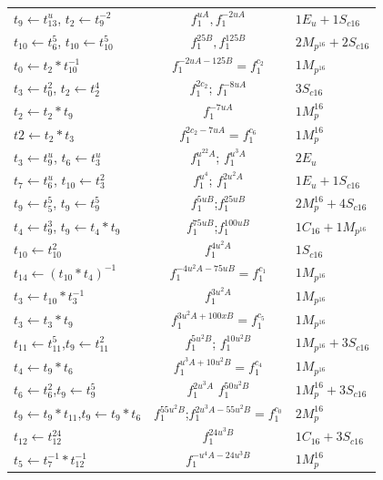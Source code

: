 \begin{center}
\begin{table}[!ht]
{\begin{tabular}{l|c|l}
			\hline
			$t_9 \leftarrow t_{13}^{u}$, $t_2 \leftarrow t_9^{-2}$& $f_1^{uA}, f_1^{-2uA}$&$1E_u+1S_{c16}$\\
			$t_{10} \leftarrow t_6^5$, 	$t_{10} \leftarrow t_{10}^5$&$ f_1^{25B}, f_1^{125B}$&$2M_{p^{16}}+2S_{c16}$\\
			$t_{0} \leftarrow t_2*t_{10}^{-1}$&$f_1^{-2uA-125B}=f_1^{c_2}$&$1M_{p^{16}}$\\
			\hline
			$t_{3} \leftarrow t_0^2$, 	$t_2 \leftarrow t_2^4$ & $f_1^{2c_2}$; $f_1^{-8uA}$ & $3S_{c16}$\\
			$t_2 \leftarrow t_2*t_9$ & $f_1^{-7uA}$& $1M_p^{16}$\\
			$t2 \leftarrow t_2*t_3$& $f_1^{2c_2-7uA} = f_1^{c_6}$& $1M_p^{16}$ \\
			$t_3 \leftarrow t_9^{u}$, $t_6 \leftarrow t_3^{u}$ & $f_1^{u^22A}$; $f_1^{u^3A}$ & $2E_u$\\
			$t_7 \leftarrow t_6^{u}$, $t_{10} \leftarrow t_3^{2}$&$f_1^{u^4}$; $f_1^{2u^2A}$& $1E_u + 1S_{c16}$\\
			\hline
			$t_{9} \leftarrow t_5^5$, $t_{9} \leftarrow t_9^5$&$f_1^{5uB}$;$f_1^{25uB}$&$2M_p^{16}+4S_{c16}$\\
			$t_{4} \leftarrow t_9^3$, $t_{9} \leftarrow t_4*t_9$&$f_1^{75uB}$;$f_1^{100uB}$& $1C_{16}+1M_{p^{16}}$\\
			$t_{10} \leftarrow t_{10}^2$& $f_1^{4u^2A}$&$1S_{c16}$\\
			$t_{14} \leftarrow (t_{10}*t_4)^{-1}$ & $f_1^{-4u^2A-75uB}=f_1^{c_1}$ & $1M_{p^{16}}$\\
			$t_{3} \leftarrow t_{10}*t_3^{-1}$& $f_1^{3u^2A}$&$1M_{p^{16}}$\\
			$t_{3} \leftarrow t_3*t_9$ & $f_1^{3u^2A+100xB}=f_1^{c_5}$ & $1M_{p^{16}}$\\
			$t_{11} \leftarrow t_{11}^5$,$t_{9} \leftarrow t_{11}^2$ & $f_1^{5u^2B}$; $f_1^{10u^2B}$ & $1M_{p^{16}} + 3S_{c16}$ \\
			$t_{4} \leftarrow t_{9}*t_{6}$& $f_1^{u^3A+10u^2B}=f_1^{c_4}$ &$1M_{p^{16}}$\\
			\hline
			$t_{6} \leftarrow t_{6}^2$,$t_{9} \leftarrow t_9^5$& $f_1^{2u^3A}$ $f_1^{50u^2B}$ &$1M_p^{16}+3S_{c16}$\\
			$t_{9} \leftarrow t_{9}*t_{11}$,$t_{9} \leftarrow t_{9}*t_{6}$&$f_1^{55u^2B}$;$f_1^{2u^3A-55u^2B}=f_1^{c_0}$&$2M_p^{16}$\\
			$t_{12} \leftarrow t_{12}^{24}$&$f_1^{24u^3B}$& $1C_{16}+3S_{c16}$\\
			$t_{5} \leftarrow t_{7}^{-1}*t_{12}^{-1}$& $f_1^{-u^4A-24u^3B}$& $1M_p^{16}$\\

\end{tabular}}
\end{table}
\end{center}
